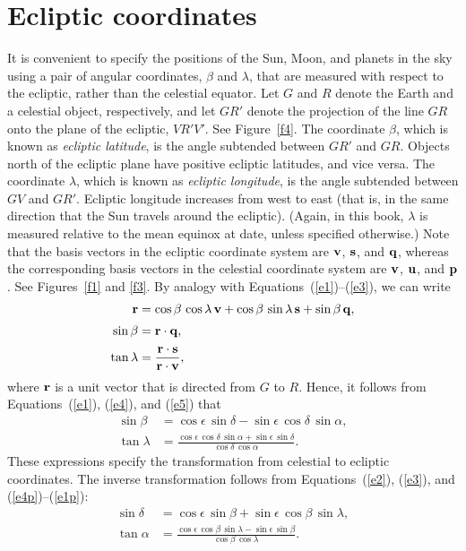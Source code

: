 \section{Ecliptic coordinates}
It is convenient to specify the positions of the Sun, Moon, and planets in the sky using
a pair of angular coordinates, $\beta$ and $\lambda$, that are measured with respect to the
ecliptic, rather than the celestial equator. Let $G$ and $R$ denote the Earth and  a celestial object, respectively, and let $GR'$ denote the
projection of the line $GR$ onto the plane of the ecliptic, $VR'V'$. See Figure~\ref{f4}. The coordinate $\beta$, which
is known as {\em ecliptic latitude}, is the angle subtended between $GR'$ and $GR$. Objects north
of the ecliptic plane have positive ecliptic latitudes, and vice versa. The coordinate $\lambda$,
which is known as {\em ecliptic longitude}, is the angle subtended between $GV$ and
$GR'$. Ecliptic longitude increases from west to east (that is, in the same direction that the Sun travels
around the ecliptic). (Again, in this book, $\lambda$ is measured relative
to the mean equinox at date, unless specified otherwise.)
Note that the basis vectors in the ecliptic coordinate system are
${\bf v}$, ${\bf s}$, and ${\bf q}$, whereas the corresponding basis vectors in the
celestial coordinate system are
${\bf v}$, ${\bf u}$, and ${\bf p}$. See Figures~\ref{f1} and \ref{f3}. By analogy with Equations~(\ref{e1})--(\ref{e3}), we can write
\begin{align}%
{\bf r} &= \cos\beta\,\cos\lambda\,{\bf v} + \cos\beta\,\sin\lambda\,{\bf s} +\sin\beta\,{\bf q},\label{e1p}\\[0.5ex]
\sin\beta &= {\bf r}\cdot {\bf q},\\[0.5ex]
\tan\lambda &= \frac{{\bf r}\cdot{\bf s}}{{\bf r}\cdot {\bf v}},
\end{align}
where ${\bf r}$ is a unit vector that is directed from $G$ to $R$. 
Hence, it follows from Equations~(\ref{e1}), (\ref{e4}), and (\ref{e5}) that
\begin{align}
\sin\beta &= \cos\epsilon\,\sin\delta - \sin\epsilon\,\cos\delta\,\sin\alpha,\\[0.5ex]
\tan\lambda &= \frac{\cos\epsilon\,\cos\delta\,\sin\alpha+\sin\epsilon\,\sin\delta}{\cos\delta\,\cos\alpha}.
\end{align}
These expressions specify the transformation from celestial to ecliptic
coordinates. The inverse transformation follows from Equations~(\ref{e2}), (\ref{e3}), and (\ref{e4p})--(\ref{e1p}):
\begin{align}\label{e10}
\sin\delta &= \cos\epsilon\,\sin\beta +\sin\epsilon\,\cos\beta\,\sin\lambda,\\[0.5ex]
\tan\alpha&=  \frac{\cos\epsilon\,\cos\beta\,\sin\lambda-\sin\epsilon\,\sin\beta }{\cos\beta\,\cos\lambda}.\label{e11}
\end{align}

